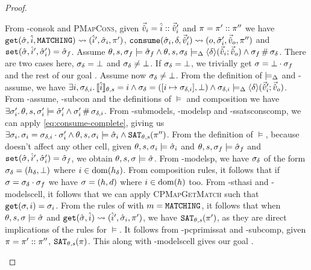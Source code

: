 \begin{proof}
\begin{hypvlist}
 From \hyp{consok} and \textsc{PMapCons}, given $\vec{\hat{v}}_i=\hat{i}::\vec{\hat{v}}_i'$ and $\pi=\pi'::\pi''$ we have $\texttt{get}(\hat{\sigma},\hat{i},\texttt{MATCHING})\rightsquigarrow(\hat{i}', \hat{\sigma}_i, \pi')$, ${\texttt{consume}(\hat{\sigma}_i,\delta,\vec{\hat{v}}_i')\rightsquigarrow (o,\hat{\sigma}_i',\vec{\hat{v}}_o,\pi'')}$ and $\texttt{set}(\hat{\sigma},\hat{i}',\hat{\sigma}_i')=\hat{\sigma}_f$.
 Assume $\theta,s,\sigma_f\models \hat{\sigma}_f \land \theta, s, \sigma_\delta \models_{\Delta} \left<\delta\right>\!(\vec{\hat{v}}_i;\vec{\hat{v}}_o) \land \sigma_f\operatorname{\#}\sigma_\delta$.
 There are two cases here, $\sigma_\delta=\bot$ and $\sigma_\delta\neq\bot$. If $\sigma_\delta=\bot$, we trivially get $\sigma=\bot\cdot\sigma_f$ and the rest of our goal .
 Assume now $\sigma_\delta\neq\bot$. From the definition of $\models_{\Delta}$ and \hyp{assume}, we have $\exists i,\sigma_{\delta,i}\ldotp \llbracket\hat{i}\rrbracket_{\theta,s}=i \land {\sigma_\delta=([i\mapsto\sigma_{\delta,i}],\bot)} \land \sigma_{\delta,i}\models_{\Delta} \left<\delta\right>\!(\vec{\hat{v}}_i';\vec{\hat{v}}_o)$.
 From \hyp{assume}, \hyp{subcon} and the definitions of $\models$  and composition we have $\exists \sigma_i'\ldotp {\theta,s,\sigma_i'\models\hat{\sigma}_i'} \land \sigma_i' \operatorname{\#} \sigma_{\delta,i}$.
 From \hyp{submodels}, \hyp{modelsp} and \hyp{ssatsconscomp}, we can apply \ref{eq:consume-complete}, giving us $\exists \sigma_i\ldotp {\sigma_i=\sigma_{\delta,i}\cdot\sigma_i'} \land \theta,s,\sigma_i\models \hat{\sigma}_i \land \texttt{SAT}_{\mathit{\theta,s}}(\pi'')$.
 From the definition of $\models$, because \consume{} doesn't affect any other cell, given ${\theta,s,\sigma_i\models\hat{\sigma}_i}$ and $\theta,s,\sigma_f\models\hat{\sigma}_f$ and $\texttt{set}(\hat{\sigma},\hat{i}',\hat{\sigma}_i')=\hat{\sigma}_f$, we obtain $\theta,s,\sigma\models\hat{\sigma}$.
 From \hyp{modelsp}, we have $\sigma_\delta$ of the form $\sigma_\delta=(h_\delta,\bot)$ where $i\in \operatorname{dom}(h_\delta)$. From composition rules, it follows that if $\sigma=\sigma_\delta\cdot\sigma_f$ we have $\sigma=(h,d)$ where $i\in \operatorname{dom}(h)$ too.
 From \hyp{sthasi} and \hyp{modelscell}, it follows that we can apply \textsc{CPMapGetMatch} such that ${\texttt{get}(\sigma,i)=\sigma_i}$.
 From the rules of  with $m=\texttt{MATCHING}$, it follows that when $\theta,s,\sigma\models\hat{\sigma}$ and $\texttt{get}(\hat{\sigma},\hat{i})\rightsquigarrow(\hat{i}',\hat{\sigma}_i,\pi')$, we have $\texttt{SAT}_{\mathit{\theta,s}}(\pi')$, as they are direct implications of the rules for $\models$.
 It follows from \hyp{pcprimissat} and \hyp{subcomp}, given $\pi=\pi'::\pi''$, $\texttt{SAT}_{\mathit{\theta,s}}(\pi)$. This along with \hyp{modelscell} gives our goal .
\end{hypvlist}



\end{proof}
